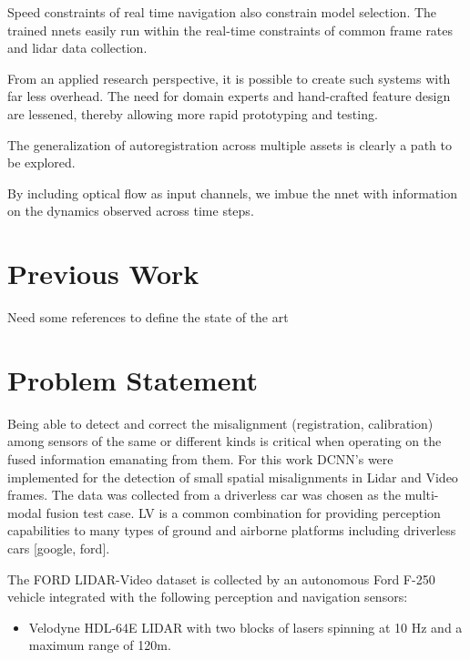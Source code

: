 \documentclass{article}
\begin{document}
Speed constraints of real time navigation also constrain model selection. The trained nnets easily run within the real-time constraints of common frame rates and lidar data collection.

From an applied research perspective, it is possible to create such systems with far less overhead. The need for domain experts and hand-crafted feature design are lessened, thereby allowing more rapid prototyping and testing. 

The generalization of autoregistration across multiple assets is clearly a path to be explored. 

By including optical flow as input channels, we imbue the nnet with information on the dynamics observed across time steps. 

\section{Previous Work} %
\label{sec:previous_work}
Need some references to define the state of the art 




\section{Problem Statement} %
\label{sec:problem_statement}

Being able to detect and correct the misalignment (registration, calibration) among sensors of the same or different kinds is critical when operating on the fused information emanating from them. For this work DCNN's were implemented for the detection of small spatial misalignments in Lidar and Video frames. The data was collected from a driverless car was chosen as the multi-modal fusion test case. LV is a common combination for providing perception capabilities to many types of ground and airborne platforms including driverless cars [google, ford]. 

The FORD LIDAR-Video dataset \cite{Pandey2011Ford-campu} is collected by an autonomous Ford F-250 vehicle integrated with the following perception and navigation sensors:
\begin{itemize}
    \item Velodyne HDL-64E LIDAR with two blocks of lasers spinning at 10 Hz and a maximum range of 120m.
\end{itemize}
\end{document}
